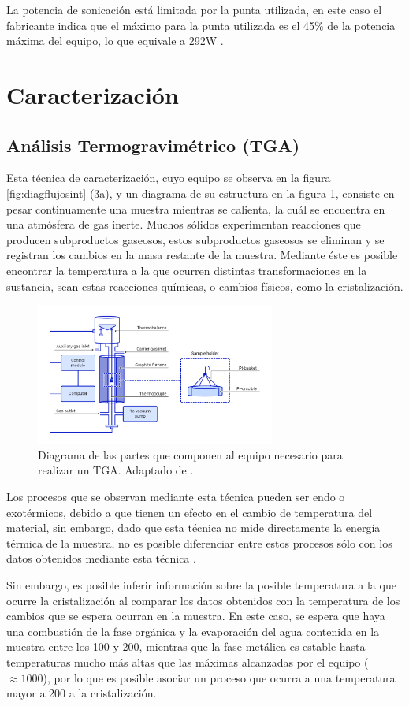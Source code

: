 \documentclass[../main.tex]{subfiles}
\begin{document}
    La potencia de sonicación está limitada por la punta utilizada, en este caso el fabricante indica que el máximo para la punta utilizada es el 45\% de la potencia máxima del equipo, lo que equivale a 292W \cite{manualpunta}.
\section{Caracterización}

\subsection{Análisis Termogravimétrico (TGA)}
Esta técnica de caracterización, cuyo equipo se observa en la figura \ref{fig:diagflujosint} (3a), y un diagrama de su estructura en la figura \ref{fig:diagTGA}, consiste en pesar continuamente una muestra mientras se calienta, la cuál se encuentra en una atmósfera de gas inerte. Muchos sólidos experimentan reacciones que producen subproductos gaseosos, estos subproductos gaseosos se eliminan y se registran los cambios en la masa restante de la muestra. Mediante éste es posible encontrar la temperatura a la que ocurren distintas transformaciones en la sustancia, sean estas reacciones químicas, o cambios físicos, como la cristalización.
\begin{figure}[H]
    \centering
    \includegraphics[width=0.7\textwidth]{fig/tgadiag.png}
    \caption{Diagrama de las partes que componen al equipo necesario para realizar un TGA. Adaptado de \cite{TGADIAG}.}
    \label{fig:diagTGA}
\end{figure}
Los procesos que se observan mediante esta técnica pueden ser endo o exotérmicos, debido a que tienen un efecto en el cambio de temperatura del material, sin embargo, dado que esta técnica no mide directamente la energía térmica de la muestra, no es posible diferenciar entre estos procesos sólo con los datos obtenidos mediante esta técnica \cite{TGA}.

Sin embargo, es posible inferir información sobre la posible temperatura a la que ocurre la cristalización al comparar los datos obtenidos con la temperatura de los cambios que se espera ocurran en la muestra. En este caso, se espera que haya una combustión de la fase orgánica y la evaporación del agua contenida en la muestra entre los 100 y 200\gradoC{}, mientras que la fase metálica es estable hasta temperaturas mucho más altas que las máximas alcanzadas por el equipo ($\approx1000$\gradoC{}), por lo que es posible asociar un proceso que ocurra a una temperatura mayor a 200\gradoC{} a la cristalización.
\end{document}
